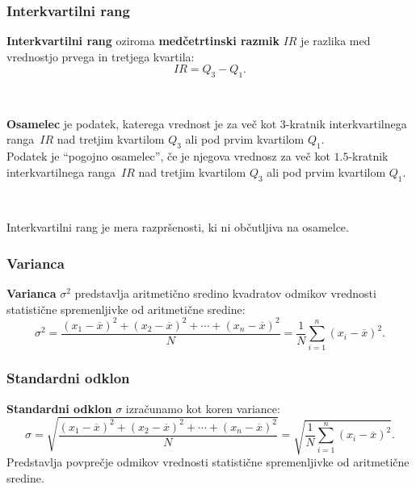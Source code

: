         

        
            \subsubsection{Interkvartilni rang}
                \textbf{Interkvartilni rang} oziroma \textbf{medčetrtinski razmik} $IR$ je razlika med vrednostjo prvega in tretjega kvartila:
                $$IR=Q_3-Q_1.$$
            
            ~
            
                \textbf{Osamelec} je podatek, katerega vrednost je za več kot $3$-kratnik interkvartilnega ranga~$IR$ nad tretjim kvartilom $Q_3$ ali pod prvim kvartilom $Q_1$. \\
                Podatek je ``pogojno osamelec'', če je njegova vrednosz za več kot $1.5$-kratnik interkvartilnega ranga~$IR$ nad tretjim kvartilom $Q_3$ ali pod prvim kvartilom $Q_1$.

            
            ~   
            
                Interkvartilni rang je mera razpršenosti, ki ni občutljiva na osamelce.
            
        

        

            \subsubsection{Varianca}
                \textbf{Varianca} $\sigma^2$ predstavlja aritmetično sredino kvadratov odmikov vrednosti statistične spremenljivke od aritmetične sredine:
                $$\sigma^2=\dfrac{(x_1-\overline{x})^2+(x_2-\overline{x})^2+\cdots+(x_n-\overline{x})^2}{N}=\dfrac{1}{N}\sum_{i=1}^n(x_i-\overline{x})^2.$$
            


            \subsubsection{Standardni odklon}
                \textbf{Standardni odklon} $\sigma$ izračunamo kot koren variance:
                $$\sigma=\sqrt{\dfrac{(x_1-\overline{x})^2+(x_2-\overline{x})^2+\cdots+(x_n-\overline{x})^2}{N}}=\sqrt{\dfrac{1}{N}\sum_{i=1}^n(x_i-\overline{x})^2}.$$
                Predstavlja povprečje odmikov vrednosti statistične spremenljivke od aritmetične sredine.
            
